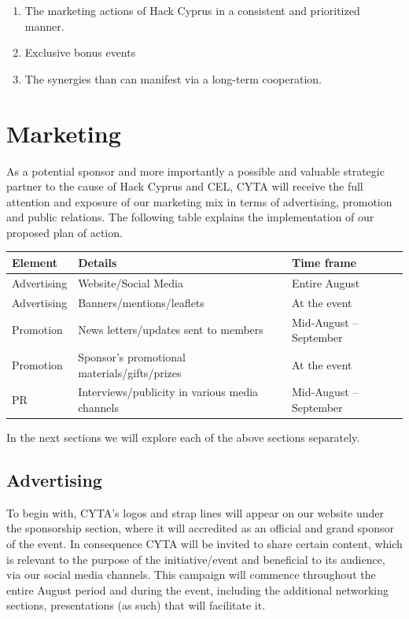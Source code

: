 \documentclass[a4paper,11pt]{report}
\begin{document}
\begin{enumerate}
  \item The marketing actions of Hack Cyprus in a consistent and prioritized manner.
  \item Exclusive bonus events  
  \item The synergies than can manifest via a long-term cooperation.
\end{enumerate}

\section{Marketing}
As a potential sponsor and more importantly a possible and valuable strategic partner to the cause of Hack Cyprus and CEL, CYTA will receive the full attention and exposure of our marketing mix in terms of advertising, promotion and public relations. The following table explains the implementation of our proposed plan of action.

\begin{table}[h]
\centering %
\begin{tabular}{l l l} %
\hline\hline                        %
Element & Details & Time frame \\ [0.5ex]   
\hline            
Advertising  & Website/Social Media                           & Entire August\\ %
Advertising  & Banners/mentions/leaflets                      & At the event\\
Promotion    & News letters/updates sent to members           & Mid-August – September\\
Promotion    & Sponsor’s promotional materials/gifts/prizes   & At the event\\
PR           & Interviews/publicity in various media channels & Mid-August – September\\
\hline 
\end{tabular}
\end{table}

In the next sections we will explore each of the above sections separately.

\subsection{Advertising}

To begin with, CYTA’s logos and strap lines will appear on our website under the sponsorship section, where it will accredited as an official and grand sponsor of the event. In consequence CYTA will be invited to share certain content, which is relevant to the purpose of the initiative/event and beneficial to its audience, via our social media channels. This campaign will commence throughout the entire August period and during the event, including the additional networking sections, presentations (as such) that will facilitate it.
\end{document}
